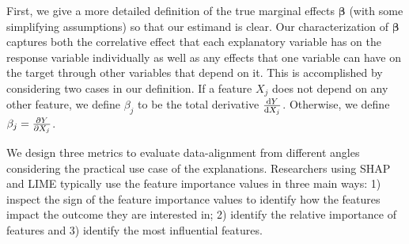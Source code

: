 \documentclass[mnsc,blindrev]{informs3}
\begin{document}
     First, we give a more detailed definition of the true marginal effects $\boldsymbol{\beta}$ (with some simplifying assumptions) so that our estimand is clear. Our characterization of $\boldsymbol{\beta}$ captures both the correlative effect that each explanatory variable has on the response variable individually as well as any effects that one variable can have on the target through other variables that depend on it. This is accomplished by considering two cases in our definition. If a feature $X_j$ does not depend on any other feature, we define $\beta_j$ to be the total derivative $\dv{Y}{X_j}$. Otherwise, we define $\beta_j = \pdv{Y}{X_j}$. 



         
          We design three metrics to evaluate data-alignment from different angles considering the practical use case of the explanations. Researchers using SHAP and LIME typically use the feature importance values in three main ways: 1) inspect the sign of the feature importance values to identify how the features impact the outcome they are interested in; %
         2)  identify the relative importance of features %
         and 3) identify the most influential features. %
\end{document}
